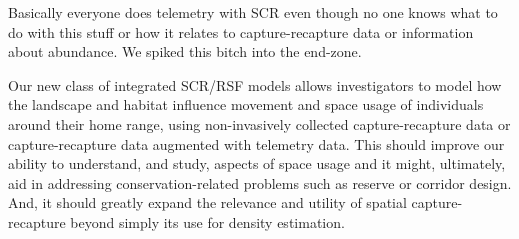 Basically everyone does telemetry with SCR even though no one knows
what to do with this stuff or how it relates to capture-recapture data
or information about abundance. We spiked this bitch into the end-zone.

Our new class of integrated SCR/RSF models allows investigators to model how the landscape and
habitat influence movement and space usage of individuals around their
home range, using non-invasively collected capture-recapture data or
capture-recapture data augmented with telemetry data.  This should
improve our ability to understand, and study, aspects of space usage
and it might, ultimately, aid in addressing conservation-related
problems such as reserve or corridor design. And, it should greatly
expand the relevance and utility of spatial capture-recapture beyond
simply its use for density estimation.






























